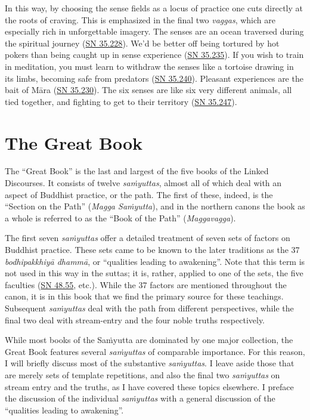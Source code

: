 \documentclass[12pt,openany]{book}%
\begin{document}
In this way, by choosing the sense fields as a locus of practice one cuts directly at the roots of craving. This is emphasized in the final two \textit{vaggas}, which are especially rich in unforgettable imagery. The senses are an ocean traversed during the spiritual journey (\href{https://suttacentral.net/sn35.228}{SN 35.228}). We’d be better off being tortured by hot pokers than being caught up in sense experience (\href{https://suttacentral.net/sn35.235}{SN 35.235}). If you wish to train in meditation, you must learn to withdraw the senses like a tortoise drawing in its limbs, becoming safe from predators (\href{https://suttacentral.net/sn35.240}{SN 35.240}). Pleasant experiences are the bait of \textsanskrit{Māra} (\href{https://suttacentral.net/sn35.230}{SN 35.230}). The six senses are like six very different animals, all tied together, and fighting to get to their territory (\href{https://suttacentral.net/sn35.247}{SN 35.247}).

\section*{The Great Book}

The “Great Book” is the last and largest of the five books of the Linked Discourses. It consists of twelve \textit{\textsanskrit{saṁyuttas}}, almost all of which deal with an aspect of Buddhist practice, or the path. The first of these, indeed, is the “Section on the Path” (\textit{Magga \textsanskrit{Saṁyutta}}), and in the northern canons the book as a whole is referred to as the “Book of the Path” (\textit{Maggavagga}).

The first seven \textit{\textsanskrit{saṁyuttas}} offer a detailed treatment of seven sets of factors on Buddhist practice. These sets came to be known to the later traditions as the 37 \textit{\textsanskrit{bodhipakkhiyā} \textsanskrit{dhammā}}, or “qualities leading to awakening”. Note that this term is not used in this way in the suttas; it is, rather, applied to one of the sets, the five faculties (\href{https://suttacentral.net/sn48.55}{SN 48.55}, etc.). While the 37 factors are mentioned throughout the canon, it is in this book that we find the primary source for these teachings. Subsequent \textit{\textsanskrit{saṁyuttas}} deal with the path from different perspectives, while the final two deal with stream-entry and the four noble truths respectively.

While most books of the \textsanskrit{Saṁyutta} are dominated by one major collection, the Great Book features several \textit{\textsanskrit{saṁyuttas}} of comparable importance. For this reason, I will briefly discuss most of the substantive \textit{\textsanskrit{saṁyuttas}}. I leave aside those that are merely sets of template repetitions, and also the final two \textit{\textsanskrit{saṁyuttas}} on stream entry and the truths, as I have covered these topics elsewhere. I preface the discussion of the individual \textit{\textsanskrit{saṁyuttas}} with a general discussion of the “qualities leading to awakening”.
\end{document}
